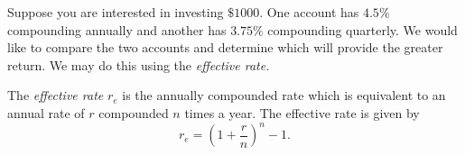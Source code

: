 Suppose you are interested in investing \(\$1000.\) One account has \(4.5\%\) compounding annually and another has \(3.75\%\) compounding quarterly. We would like to compare the two accounts and determine which will provide the greater return. We may do this using the \emph{effective rate.}

\begin{definition}
    The \emph{effective rate} \(r_e\) is the annually compounded rate which is equivalent to an annual rate of \(r\) compounded \(n\) times a year. The effective rate is given by
    \[r_e = \left(1+\frac{r}{n}\right)^n-1.\]
\end{definition}